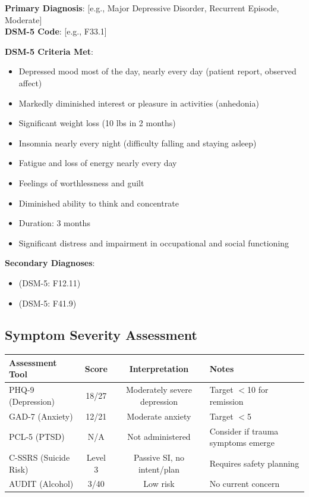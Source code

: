 \documentclass[11pt,letterpaper]{article}
\begin{document}
\textbf{Primary Diagnosis}: [e.g., Major Depressive Disorder, Recurrent Episode, Moderate]\\
\textbf{DSM-5 Code}: [e.g., F33.1]

\textbf{DSM-5 Criteria Met}:
\begin{itemize}[leftmargin=*]
    \item Depressed mood most of the day, nearly every day (patient report, observed affect)
    \item Markedly diminished interest or pleasure in activities (anhedonia)
    \item Significant weight loss (10 lbs in 2 months)
    \item Insomnia nearly every night (difficulty falling and staying asleep)
    \item Fatigue and loss of energy nearly every day
    \item Feelings of worthlessness and guilt
    \item Diminished ability to think and concentrate
    \item Duration: 3 months
    \item Significant distress and impairment in occupational and social functioning
\end{itemize}

\textbf{Secondary Diagnoses}:
\begin{itemize}[leftmargin=*]
    \item [e.g., Cannabis Use Disorder, Mild, In Sustained Remission] (DSM-5: F12.11)
    \item [e.g., Unspecified Anxiety Disorder] (DSM-5: F41.9)
\end{itemize}

\subsection*{Symptom Severity Assessment}

\begin{tabularx}{\textwidth}{|l|c|c|X|}
\hline
\textbf{Assessment Tool} & \textbf{Score} & \textbf{Interpretation} & \textbf{Notes} \\ \hline
PHQ-9 (Depression) & 18/27 & Moderately severe depression & Target $<$10 for remission \\ \hline
GAD-7 (Anxiety) & 12/21 & Moderate anxiety & Target $<$5 \\ \hline
PCL-5 (PTSD) & N/A & Not administered & Consider if trauma symptoms emerge \\ \hline
C-SSRS (Suicide Risk) & Level 3 & Passive SI, no intent/plan & Requires safety planning \\ \hline
AUDIT (Alcohol) & 3/40 & Low risk & No current concern \\ \hline
\end{tabularx}
\end{document}
